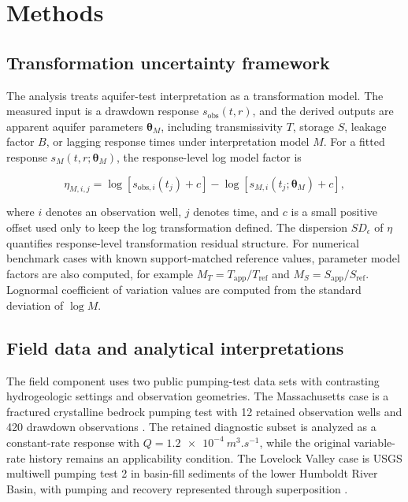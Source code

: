 \documentclass[a4paper,fleqn]{cas-sc}
\begin{document}
\section{Methods}

\subsection{Transformation uncertainty framework}

The analysis treats aquifer-test interpretation as a transformation model. The measured input is a drawdown response $s_{\mathrm{obs}}(t,r)$, and the derived outputs are apparent aquifer parameters $\boldsymbol{\theta}_M$, including transmissivity $T$, storage $S$, leakage factor $B$, or lagging response times under interpretation model $M$. For a fitted response $s_M(t,r;\boldsymbol{\theta}_M)$, the response-level log model factor is

\begin{equation}
\eta_{M,i,j}=\log[s_{\mathrm{obs},i}(t_j)+c]-\log[s_{M,i}(t_j;\boldsymbol{\theta}_M)+c],
\label{eq:eta}
\end{equation}

\noindent where $i$ denotes an observation well, $j$ denotes time, and $c$ is a small positive offset used only to keep the log transformation defined. The dispersion $SD_\epsilon$ of $\eta$ quantifies response-level transformation residual structure. For numerical benchmark cases with known support-matched reference values, parameter model factors are also computed, for example $M_T=T_{\mathrm{app}}/T_{\mathrm{ref}}$ and $M_S=S_{\mathrm{app}}/S_{\mathrm{ref}}$. Lognormal coefficient of variation values are computed from the standard deviation of $\log M$.

\subsection{Field data and analytical interpretations}

The field component uses two public pumping-test data sets with contrasting hydrogeologic settings and observation geometries. The Massachusetts case is a fractured crystalline bedrock pumping test with 12 retained observation wells and 420 drawdown observations \citep{cho2004pumping,cho2008characterization}. The retained diagnostic subset is analyzed as a constant-rate response with $Q=\SI{1.2e-4}{m^3.s^{-1}}$, while the original variable-rate history remains an applicability condition. The Lovelock Valley case is USGS multiwell pumping test 2 in basin-fill sediments of the lower Humboldt River Basin, with pumping and recovery represented through superposition \citep{nadler2020report,nadler2020data}.
\end{document}
